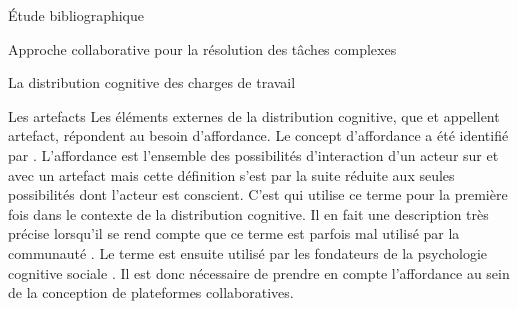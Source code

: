 \documentclass[myfrancais,ngerman,english,french]{mythesis}
\begin{document}
\begin{mychapter}{Étude bibliographique}
\begin{mysection}{Approche collaborative pour la résolution des tâches complexes}
\begin{mysubsection}{La distribution cognitive des charges de travail}
				\begin{mysubsubsection}{Les artefacts}
					Les éléments externes de la distribution cognitive, que  et  appellent artefact, répondent au besoin d'affordance.
					Le concept d'affordance a été identifié par .
					L'affordance est l'ensemble des possibilités d'interaction d'un acteur sur et avec un artefact  mais cette définition s'est par la suite réduite aux seules possibilités dont l'acteur est conscient.
					C'est  qui utilise ce terme pour la première fois dans le contexte de la distribution cognitive.
					Il en fait une description très précise lorsqu'il se rend compte que ce terme est parfois mal utilisé par la communauté .
					Le terme est ensuite utilisé par les fondateurs de la psychologie cognitive sociale .
					Il est donc nécessaire de prendre en compte l'affordance au sein de la conception de plateformes collaboratives.


\end{mysubsubsection}
\end{mysubsection}
\end{mysection}
\end{mychapter}
\end{document}
